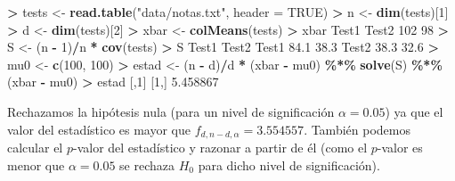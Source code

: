 \documentclass[
  a4paper,
  oneside]{scrbook}
\newenvironment{Shaded}{\begin{snugshade}}{\end{snugshade}}
\newcommand{\AttributeTok}[1]{\textcolor[rgb]{0.13,0.29,0.53}{#1}}
\newcommand{\ConstantTok}[1]{\textcolor[rgb]{0.56,0.35,0.01}{#1}}
\newcommand{\DecValTok}[1]{\textcolor[rgb]{0.00,0.00,0.81}{#1}}
\newcommand{\FloatTok}[1]{\textcolor[rgb]{0.00,0.00,0.81}{#1}}
\newcommand{\FunctionTok}[1]{\textcolor[rgb]{0.13,0.29,0.53}{\textbf{#1}}}
\newcommand{\NormalTok}[1]{#1}
\newcommand{\OtherTok}[1]{\textcolor[rgb]{0.56,0.35,0.01}{#1}}
\newcommand{\SpecialCharTok}[1]{\textcolor[rgb]{0.81,0.36,0.00}{\textbf{#1}}}
\newcommand{\StringTok}[1]{\textcolor[rgb]{0.31,0.60,0.02}{#1}}
\theoremstyle{definition}
\theoremstyle{definition}
\theoremstyle{definition}
\theoremstyle{definition}
\theoremstyle{remark}
\begin{document}
\begin{Shaded}
\begin{Highlighting}[]
\SpecialCharTok{\textgreater{}}\NormalTok{ tests }\OtherTok{\textless{}{-}} \FunctionTok{read.table}\NormalTok{(}\StringTok{"data/notas.txt"}\NormalTok{, }\AttributeTok{header =} \ConstantTok{TRUE}\NormalTok{)}
\SpecialCharTok{\textgreater{}}\NormalTok{ n }\OtherTok{\textless{}{-}} \FunctionTok{dim}\NormalTok{(tests)[}\DecValTok{1}\NormalTok{]}
\SpecialCharTok{\textgreater{}}\NormalTok{ d }\OtherTok{\textless{}{-}} \FunctionTok{dim}\NormalTok{(tests)[}\DecValTok{2}\NormalTok{]}
\SpecialCharTok{\textgreater{}}\NormalTok{ xbar }\OtherTok{\textless{}{-}} \FunctionTok{colMeans}\NormalTok{(tests)}
\SpecialCharTok{\textgreater{}}\NormalTok{ xbar}
\NormalTok{Test1 Test2 }
  \DecValTok{102}    \DecValTok{98} 
\SpecialCharTok{\textgreater{}}\NormalTok{ S }\OtherTok{\textless{}{-}}\NormalTok{ (n }\SpecialCharTok{{-}} \DecValTok{1}\NormalTok{)}\SpecialCharTok{/}\NormalTok{n }\SpecialCharTok{*} \FunctionTok{cov}\NormalTok{(tests)}
\SpecialCharTok{\textgreater{}}\NormalTok{ S}
\NormalTok{      Test1 Test2}
\NormalTok{Test1  }\FloatTok{84.1}  \FloatTok{38.3}
\NormalTok{Test2  }\FloatTok{38.3}  \FloatTok{32.6}
\SpecialCharTok{\textgreater{}}\NormalTok{ mu0 }\OtherTok{\textless{}{-}} \FunctionTok{c}\NormalTok{(}\DecValTok{100}\NormalTok{, }\DecValTok{100}\NormalTok{)}
\SpecialCharTok{\textgreater{}}\NormalTok{ estad }\OtherTok{\textless{}{-}}\NormalTok{ (n }\SpecialCharTok{{-}}\NormalTok{ d)}\SpecialCharTok{/}\NormalTok{d }\SpecialCharTok{*}\NormalTok{ (xbar }\SpecialCharTok{{-}}\NormalTok{ mu0) }\SpecialCharTok{\%*\%} \FunctionTok{solve}\NormalTok{(S) }\SpecialCharTok{\%*\%}\NormalTok{ (xbar }\SpecialCharTok{{-}}\NormalTok{ mu0)}
\SpecialCharTok{\textgreater{}}\NormalTok{ estad}
\NormalTok{         [,}\DecValTok{1}\NormalTok{]}
\NormalTok{[}\DecValTok{1}\NormalTok{,] }\FloatTok{5.458867}
\end{Highlighting}
\end{Shaded}

\normalsize

Rechazamos la hipótesis nula (para un nivel de significación
\(\alpha=0.05\)) ya que el valor del estadístico es mayor que
\(f_{d,n-d,\alpha}=3.554557\). También podemos calcular el \(p\)-valor del
estadístico y razonar a partir de él (como el \(p\)-valor es menor que
\(\alpha=0.05\) se rechaza \(H_0\) para dicho nivel de significación).

\footnotesize
\end{document}

